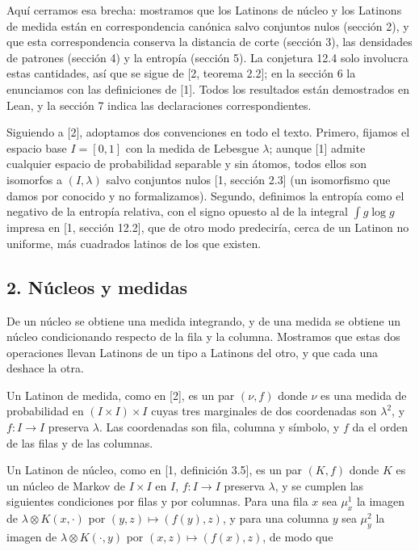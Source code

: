 \documentclass[spanish,11pt,a4paper]{article}
\begin{document}
Aquí cerramos esa brecha: mostramos que los Latinons de núcleo y los Latinons de medida están en correspondencia canónica salvo conjuntos nulos (sección 2), y que esta correspondencia conserva la distancia de corte (sección 3), las densidades de patrones (sección 4) y la entropía (sección 5). La conjetura 12.4 solo involucra estas cantidades, así que se sigue de {[}2, teorema 2.2{]}; en la sección 6 la enunciamos con las definiciones de {[}1{]}. Todos los resultados están demostrados en Lean, y la sección 7 indica las declaraciones correspondientes.

Siguiendo a {[}2{]}, adoptamos dos convenciones en todo el texto. Primero, fijamos el espacio base \(I=[0,1]\) con la medida de Lebesgue \(\lambda\); aunque {[}1{]} admite cualquier espacio de probabilidad separable y sin átomos, todos ellos son isomorfos a \((I,\lambda)\) salvo conjuntos nulos {[}1, sección 2.3{]} (un isomorfismo que damos por conocido y no formalizamos). Segundo, definimos la entropía como el negativo de la entropía relativa, con el signo opuesto al de la integral \(\int g\log g\) impresa en {[}1, sección 12.2{]}, que de otro modo predeciría, cerca de un Latinon no uniforme, más cuadrados latinos de los que existen.

\subsection{2. Núcleos y medidas}\label{nuxfacleos-y-medidas}

De un núcleo se obtiene una medida integrando, y de una medida se obtiene un núcleo condicionando respecto de la fila y la columna. Mostramos que estas dos operaciones llevan Latinons de un tipo a Latinons del otro, y que cada una deshace la otra.

Un Latinon de medida, como en {[}2{]}, es un par \((\nu,f)\) donde \(\nu\) es una medida de probabilidad en \((I\times I)\times I\) cuyas tres marginales de dos coordenadas son \(\lambda^2\), y \(f:I\to I\) preserva \(\lambda\). Las coordenadas son fila, columna y símbolo, y \(f\) da el orden de las filas y de las columnas.

Un Latinon de núcleo, como en {[}1, definición 3.5{]}, es un par \((K,f)\) donde \(K\) es un núcleo de Markov de \(I\times I\) en \(I\), \(f:I\to I\) preserva \(\lambda\), y se cumplen las siguientes condiciones por filas y por columnas. Para una fila \(x\) sea \(\mu^1_x\) la imagen de \(\lambda\otimes K(x,\cdot)\) por \((y,z)\mapsto(f(y),z)\), y para una columna \(y\) sea \(\mu^2_y\) la imagen de \(\lambda\otimes K(\cdot,y)\) por \((x,z)\mapsto(f(x),z)\), de modo que
\end{document}
